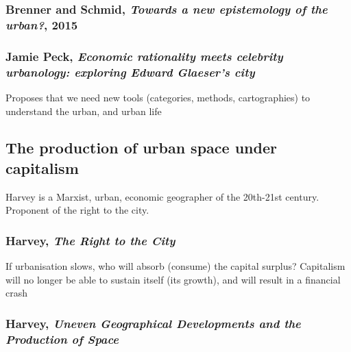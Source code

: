 \documentclass{article}
\begin{document}
\subsubsection{Brenner and Schmid, \textit{Towards a new epistemology of the urban?}, 2015}

\subsubsection{Jamie Peck, \textit{Economic rationality meets celebrity urbanology: exploring Edward Glaeser's city}}

\begin{outline}
	\1 Proposes that we need new tools (categories, methods, cartographies) to understand the urban, and urban life
\end{outline}

\subsection{The production of urban space under capitalism}

Harvey is a Marxist, urban, economic geographer of the 20th-21st century. Proponent of the right to the city. 

\subsubsection{Harvey, \textit{The Right to the City}}

\begin{outline}
	\1 If urbanisation slows, who will absorb (consume) the capital surplus? Capitalism will no longer be able to sustain itself (its growth), and will result in a financial crash
\end{outline}

\subsubsection{Harvey, \textit{Uneven Geographical Developments and the Production of Space}}
\end{document}

